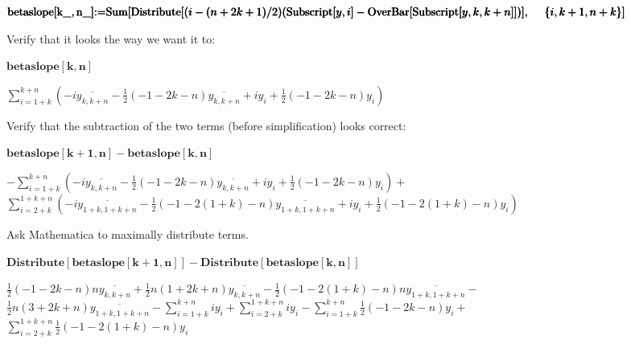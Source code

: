 \documentclass{article}
\begin{document}
\noindent\(\pmb{\text{betaslope}[\text{k$\_$},\text{n$\_$}] \text{:=} \text{Sum}[\text{Distribute}[(i-(n+2k+1)/2)(\text{Subscript}[y,i] - \text{OverBar}[\text{Subscript}[y,k,k+n]])],}\\
\indent\pmb{\{i,
k+1, n+k\}]}\)

Verify that it looks the way we want it to:

\begin{doublespace}
\noindent\(\pmb{\text{betaslope}[k,n]}\)
\end{doublespace}

\begin{doublespace}
\noindent\(\sum _{i=1+k}^{k+n} \left(-i \overline{y_{k,k+n}}-\frac{1}{2} (-1-2 k-n) \overline{y_{k,k+n}}+i y_i+\frac{1}{2} (-1-2 k-n) y_i\right)\)
\end{doublespace}

Verify that the subtraction of the two terms (before simplification) looks correct:

\begin{doublespace}
\noindent\(\pmb{\text{betaslope}[k+1, n] - \text{betaslope}[k, n]}\)
\end{doublespace}

\begin{doublespace}
\noindent\(-\sum _{i=1+k}^{k+n} \left(-i \overline{y_{k,k+n}}-\frac{1}{2} (-1-2 k-n) \overline{y_{k,k+n}}+i y_i+\frac{1}{2} (-1-2 k-n) y_i\right)+\)\\
\indent\(\sum
_{i=2+k}^{1+k+n} \left(-i \overline{y_{1+k,1+k+n}}-\frac{1}{2} (-1-2 (1+k)-n) \overline{y_{1+k,1+k+n}}+i y_i+\frac{1}{2} (-1-2 (1+k)-n) y_i\right)\)
\end{doublespace}

Ask Mathematica to maximally distribute terms.

\begin{doublespace}
\noindent\(\pmb{\text{Distribute}[\text{betaslope}[k+1, n]] - \text{Distribute}[\text{betaslope}[k, n]]}\)
\end{doublespace}

\begin{doublespace}
\noindent\(\frac{1}{2} (-1-2 k-n) n \overline{y_{k,k+n}}+\frac{1}{2} n (1+2 k+n) \overline{y_{k,k+n}}-\frac{1}{2} (-1-2 (1+k)-n) n \overline{y_{1+k,1+k+n}}-\)\\
\indent\(\frac{1}{2}
n (3+2 k+n) \overline{y_{1+k,1+k+n}}-\sum _{i=1+k}^{k+n} i y_i+\sum _{i=2+k}^{1+k+n} i y_i-\sum _{i=1+k}^{k+n} \frac{1}{2} (-1-2 k-n) y_i+\)\\
\indent\(\sum _{i=2+k}^{1+k+n}
\frac{1}{2} (-1-2 (1+k)-n) y_i\)
\end{doublespace}
\end{document}
